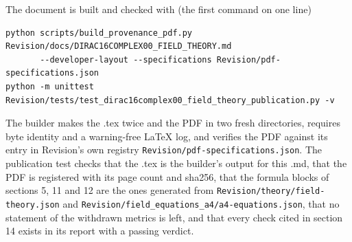 \documentclass[11pt]{article}
\begin{document}
The document is built and checked with (the first command on one line)

\begin{Verbatim}[fontsize=\small]
python scripts/build_provenance_pdf.py Revision/docs/DIRAC16COMPLEX00_FIELD_THEORY.md
       --developer-layout --specifications Revision/pdf-specifications.json
python -m unittest Revision/tests/test_dirac16complex00_field_theory_publication.py -v
\end{Verbatim}

The builder makes the .tex twice and the PDF in two fresh directories, requires byte identity and a warning-free LaTeX log, and verifies the PDF against its entry in Revision's own registry \texttt{Revision\allowbreak{}/pdf-spe\allowbreak{}cificati\allowbreak{}ons.json}. The publication test checks that the .tex is the builder's output for this .md, that the PDF is registered with its page count and sha256, that the formula blocks of sections 5, 11 and 12 are the ones generated from \texttt{Revision\allowbreak{}/theory/\allowbreak{}field-th\allowbreak{}eory.jso\allowbreak{}n} and \texttt{Revision\allowbreak{}/field\_e\allowbreak{}quations\allowbreak{}\_a4/a4-e\allowbreak{}quations\allowbreak{}.json}, that no statement of the withdrawn metrics is left, and that every check cited in section 14 exists in its report with a passing verdict.
\end{document}
